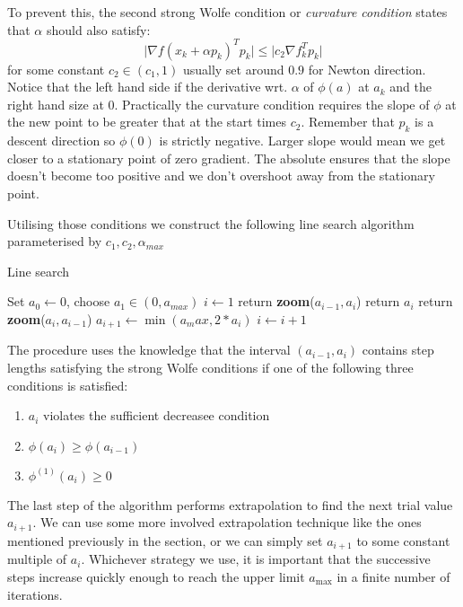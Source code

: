 \documentclass[11pt]{report}
\begin{document}
    To prevent this, the second strong Wolfe condition or \textit{curvature condition} states that $\alpha$ should also satisfy:
    \begin{equation}
        \lvert \nabla f(x_k + \alpha p_k )^T p_k \rvert \leq \lvert c_2 \nabla f_k^T p_k \rvert
    \end{equation}
    for some constant $c_2 \in (c_1, 1)$ usually set around $0.9$ for Newton direction.
    Notice that the left hand side if the derivative wrt. $\alpha$ of $\phi(a)$ at $a_k$ and the right hand size at $0$.
    Practically the curvature condition requires the slope of $\phi$ at the new point to be greater that at the start times $c_2$.
    Remember that $p_k$ is a descent direction so $\phi(0)$ is strictly negative.
    Larger slope would mean we get closer to a stationary point of zero gradient.
    The absolute ensures that the slope doesn't become too positive and we don't overshoot away from the stationary point.

    Utilising those conditions we construct the following line search algorithm parameterised by $c_1, c_2, \alpha_{max}$

    \begin{algorithm}
        \caption{Line search}
        \label{alg:linesearh}
        \begin{algorithmic}
            \State Set $a_0 \gets 0$, choose $a_1 \in (0, a_{max})$
            \State $i \gets 1$
            \Repeat
                    \State return \textbf{zoom}($a_{i-1}, a_i$)
                \EndIf
                    \State return $a_i$
                \EndIf
                    \State return \textbf{zoom}($a_i, a_{i-1}$)
                \EndIf
                \State $a_{i+1} \gets \min({a_max, 2*a_i})$
                \State $i \gets i+1$
            \Until
        \end{algorithmic}
    \end{algorithm}

    The procedure uses the knowledge that the interval $(a_{i-1} , a_{i})$ contains step lengths satisfying the strong Wolfe
    conditions if one of the following three conditions is satisfied:
    \begin{enumerate}
        \item $a_i$ violates the sufficient decreasee condition
        \item $\phi(a_i) \geq \phi(a_{i-1}) $
        \item $\phi^{(1)}(a_i) \geq 0$
    \end{enumerate}
    The last step of the algorithm performs extrapolation to find the next trial value $a_{i+1}$.
    We can use some more involved extrapolation technique like the ones mentioned previously in the section, or
    we can simply set $a_{i+1}$ to some constant multiple of $a_i$.
    Whichever strategy we use, it is
    important that the successive steps increase quickly enough to reach the upper limit $a_{\max}$ in
    a finite number of iterations.
\end{document}
